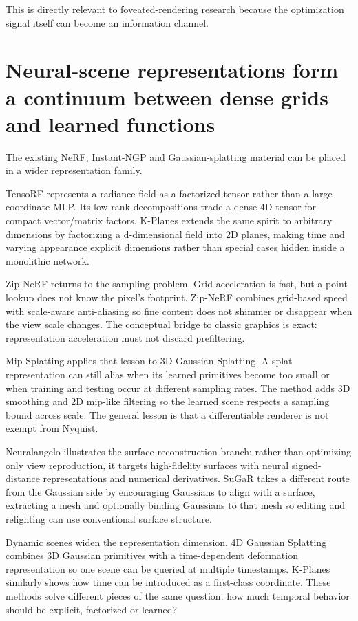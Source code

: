 This is directly relevant to foveated-rendering research because the optimization signal itself can become an information channel.

\section{Neural-scene representations form a continuum between dense grids and learned functions}\label{04-visual-computing-ii-ch035-neural-scene-representations-form-a-continuum-between-dense-grids-and-learned-functions}

The existing NeRF, Instant-NGP and Gaussian-splatting material can be placed in a wider representation family.

TensoRF represents a radiance field as a factorized tensor rather than a large coordinate MLP. Its low-rank decompositions trade a dense 4D tensor for compact vector/matrix factors. K-Planes extends the same spirit to arbitrary dimensions by factorizing a d-dimensional field into 2D planes, making time and varying appearance explicit dimensions rather than special cases hidden inside a monolithic network.

Zip-NeRF returns to the sampling problem. Grid acceleration is fast, but a point lookup does not know the pixel's footprint. Zip-NeRF combines grid-based speed with scale-aware anti-aliasing so fine content does not shimmer or disappear when the view scale changes. The conceptual bridge to classic graphics is exact: representation acceleration must not discard prefiltering.

Mip-Splatting applies that lesson to 3D Gaussian Splatting. A splat representation can still alias when its learned primitives become too small or when training and testing occur at different sampling rates. The method adds 3D smoothing and 2D mip-like filtering so the learned scene respects a sampling bound across scale. The general lesson is that a differentiable renderer is not exempt from Nyquist.

Neuralangelo illustrates the surface-reconstruction branch: rather than optimizing only view reproduction, it targets high-fidelity surfaces with neural signed-distance representations and numerical derivatives. SuGaR takes a different route from the Gaussian side by encouraging Gaussians to align with a surface, extracting a mesh and optionally binding Gaussians to that mesh so editing and relighting can use conventional surface structure.

Dynamic scenes widen the representation dimension. 4D Gaussian Splatting combines 3D Gaussian primitives with a time-dependent deformation representation so one scene can be queried at multiple timestamps. K-Planes similarly shows how time can be introduced as a first-class coordinate. These methods solve different pieces of the same question: how much temporal behavior should be explicit, factorized or learned?


